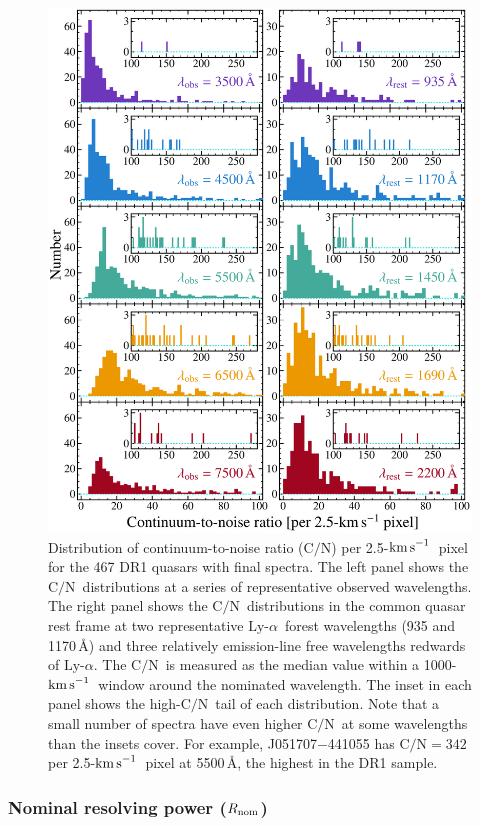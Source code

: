\documentclass[fleqn,usenatbib,usedcolumn]{mnras}
\newcommand{\kms}{\ensuremath{\textrm{km\,s}^{-1}}}
\newcommand{\CN}{\ensuremath{\textrm{C/N}}}
\newcommand{\lya}{\ensuremath{\textrm{Ly-}\alpha}}
\begin{document}
\begin{figure}
\begin{center}
\includegraphics[width=0.90\columnwidth]{DR1_CNR.pdf}
\vspace{-1em}
\caption{Distribution of continuum-to-noise ratio (\CN) per 2.5-\kms\ pixel for the 467 DR1 quasars with final spectra. The left panel shows the \CN\ distributions at a series of representative observed wavelengths. The right panel shows the \CN\ distributions in the common quasar rest frame at two representative \lya\ forest wavelengths (935 and 1170\,\AA) and three relatively emission-line free wavelengths redwards of \lya. The \CN\ is measured as the median value within a 1000-\kms\ window around the nominated wavelength. The inset in each panel shows the high-\CN\ tail of each distribution. Note that a small number of spectra have even higher \CN\ at some wavelengths than the insets cover. For example, J051707$-$441055 has $\CN=342$ per 2.5-\kms\ pixel at 5500\,\AA, the highest in the DR1 sample.}
\label{f:cnr}
\end{center}
\end{figure}

\subsubsection{Nominal resolving power ($R_{\rm nom}$)}\label{sss:Rnom}
\end{document}
